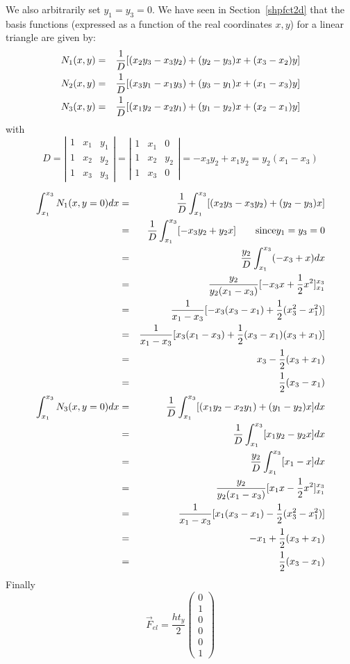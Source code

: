 We also arbitrarily set $y_1=y_3=0$. We have seen in Section~\ref{shpfct2d} that 
the basis functions (expressed as a function of the real coordinates $x,y$) 
for a linear triangle are given by:
\begin{eqnarray}
N_1(x,y) &=& \frac{1}{D}[(x_2y_3-x_3y_2) + (y_2-y_3)x + (x_3-x_2)y] \nonumber\\
N_2(x,y) &=& \frac{1}{D}[(x_3y_1-x_1y_3) + (y_3-y_1)x + (x_1-x_3)y] \nonumber\\
N_3(x,y) &=& \frac{1}{D}[(x_1y_2-x_2y_1) + (y_1-y_2)x + (x_2-x_1)y] \nonumber
\end{eqnarray}
with 
\[
D = 
\left|
\begin{array}{ccc}
1 & x_1 & y_1 \\
1 & x_2 & y_2 \\
1 & x_3 & y_3 
\end{array}
\right|
=
\left|
\begin{array}{ccc}
1 & x_1 & 0 \\
1 & x_2 & y_2 \\
1 & x_3 & 0 
\end{array}
\right|
=
-x_3y_2+x_1y_2
= y_2(x_1-x_3)
\]


\begin{eqnarray}
\int_{x_1}^{x_3} N_1(x,y=0) dx 
&=& \frac{1}{D} \int_{x_1}^{x_3} [(x_2y_3-x_3y_2) + (y_2-y_3)x ] \nonumber\\
&=& \frac{1}{D} \int_{x_1}^{x_3} [-x_3y_2 + y_2 x ] \qquad \text{since} y_1=y_3=0 \nonumber\\
&=& \frac{y_2}{D} \int_{x_1}^{x_3} (-x_3 +  x ) dx \nonumber\\
&=& \frac{y_2}{y_2(x_1-x_3)  } [ -x_3 x + \frac{1}{2}x^2]_{x_1}^{x_3} \nonumber\\ 
&=& \frac{1}{x_1-x_3 } [ -x_3 (x_3-x_1) + \frac{1}{2}(x_3^2-x_1^2)] \nonumber\\
&=& \frac{1}{x_1-x_3 } [ x_3 (x_1-x_3) + \frac{1}{2}(x_3-x_1)(x_3+x_1)] \nonumber\\
&=&  x_3 - \frac{1}{2}(x_3+x_1) \nonumber\\
&=&  \frac{1}{2} (x_3-x_1) \\
\int_{x_1}^{x_3} N_3(x,y=0) dx
&=& \frac{1}{D} \int_{x_1}^{x_3}    [(x_1y_2-x_2y_1) + (y_1-y_2)x ] dx \nonumber\\
&=& \frac{1}{D} \int_{x_1}^{x_3}    [x_1y_2 - y_2x ] dx \nonumber\\
&=& \frac{y_2}{D} \int_{x_1}^{x_3}    [x_1 - x ] dx \nonumber\\
&=& \frac{y_2}{y_2(x_1-x_3) } [x_1 x - \frac{1}{2} x^2]_{x_1}^{x_3}  \nonumber\\
&=& \frac{1}{x_1-x_3} [x_1 (x_3-x_1) - \frac{1}{2} (x_3^2-x_1^2)] \nonumber\\
&=& -x_1  + \frac{1}{2} (x_3+ x_1) \nonumber\\
&=& \frac{1}{2}( x_3 -x_1 )
\end{eqnarray}
Finally
\[
\vec{F}_{el}=
\frac{h t_y}{2}
\left(
\begin{array}{c}
0\\
1 \\
0\\
0\\
0\\
1 
\end{array}
\right)
\]





